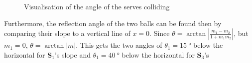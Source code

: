 \documentclass{article}
\begin{document}
\begin{figure}[hbtp]
														\caption{Visualisation of the angle of the serves colliding}
													\end{figure}

													Furthermore, the reflection angle of the two balls can be found then by comparing their slope to a vertical line of \(x=0\). Since \(\theta = \arctan|\frac{m_{1}-m_{2}}{1+m_{1}m_{2}}|\), but \(m_{1} = 0\), \(\theta = \arctan|m|\). This gets the two angles of \(\theta_{1} = \SI{15}{\degree}\) below the horizontal for \(\mathbf{S}_1\)'s slope and \(\theta_{1} = \SI{40}{\degree}\) below the horizontal for \(\mathbf{S}_3\)'s
\end{document}
